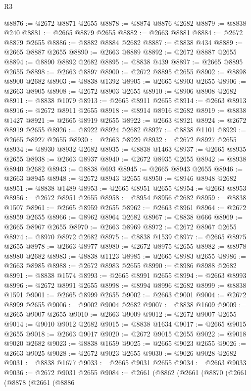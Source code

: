 \begin{lexlean}{R3}
\begin{coremodule}
@8876 := @2672 @8871 @2655
@8878 := @8874 @8876 @2682
@8879 := @8838 @240
@8881 := @2665 @8879 @2655
@8882 := @2663 @8881
@8884 := @2672 @8879 @2655
@8886 := @8882 @8884 @2682
@8887 := @8838 @434
@8889 := @2665 @8887 @2655
@8890 := @2663 @8889
@8892 := @2672 @8887 @2655
@8894 := @8890 @8892 @2682
@8895 := @8838 @439
@8897 := @2665 @8895 @2655
@8898 := @2663 @8897
@8900 := @2672 @8895 @2655
@8902 := @8898 @8900 @2682
@8903 := @8838 @1392
@8905 := @2665 @8903 @2655
@8906 := @2663 @8905
@8908 := @2672 @8903 @2655
@8910 := @8906 @8908 @2682
@8911 := @8838 @1079
@8913 := @2665 @8911 @2655
@8914 := @2663 @8913
@8916 := @2672 @8911 @2655
@8918 := @8914 @8916 @2682
@8919 := @8838 @1427
@8921 := @2665 @8919 @2655
@8922 := @2663 @8921
@8924 := @2672 @8919 @2655
@8926 := @8922 @8924 @2682
@8927 := @8838 @1101
@8929 := @2665 @8927 @2655
@8930 := @2663 @8929
@8932 := @2672 @8927 @2655
@8934 := @8930 @8932 @2682
@8935 := @8838 @1463
@8937 := @2665 @8935 @2655
@8938 := @2663 @8937
@8940 := @2672 @8935 @2655
@8942 := @8938 @8940 @2682
@8943 := @8838 @693
@8945 := @2665 @8943 @2655
@8946 := @2663 @8945
@8948 := @2672 @8943 @2655
@8950 := @8946 @8948 @2682
@8951 := @8838 @1489
@8953 := @2665 @8951 @2655
@8954 := @2663 @8953
@8956 := @2672 @8951 @2655
@8958 := @8954 @8956 @2682
@8959 := @8838 @1507
@8961 := @2665 @8959 @2655
@8962 := @2663 @8961
@8964 := @2672 @8959 @2655
@8966 := @8962 @8964 @2682
@8967 := @8838 @666
@8969 := @2665 @8967 @2655
@8970 := @2663 @8969
@8972 := @2672 @8967 @2655
@8974 := @8970 @8972 @2682
@8975 := @8838 @1539
@8977 := @2665 @8975 @2655
@8978 := @2663 @8977
@8980 := @2672 @8975 @2655
@8982 := @8978 @8980 @2682
@8983 := @8838 @1123
@8985 := @2665 @8983 @2655
@8986 := @2663 @8985
@8988 := @2672 @8983 @2655
@8990 := @8986 @8988 @2682
@8991 := @8838 @1574
@8993 := @2665 @8991 @2655
@8994 := @2663 @8993
@8996 := @2672 @8991 @2655
@8998 := @8994 @8996 @2682
@8999 := @8838 @1591
@9001 := @2665 @8999 @2655
@9002 := @2663 @9001
@9004 := @2672 @8999 @2655
@9006 := @9002 @9004 @2682
@9007 := @8838 @1609
@9009 := @2665 @9007 @2655
@9010 := @2663 @9009
@9012 := @2672 @9007 @2655
@9014 := @9010 @9012 @2682
@9015 := @8838 @1634
@9017 := @2665 @9015 @2655
@9018 := @2663 @9017
@9020 := @2672 @9015 @2655
@9022 := @9018 @9020 @2682
@9023 := @8838 @1659
@9025 := @2665 @9023 @2655
@9026 := @2663 @9025
@9028 := @2672 @9023 @2655
@9030 := @9026 @9028 @2682
@9031 := @8838 @1677
@9033 := @2665 @9031 @2655
@9034 := @2663 @9033
@9036 := @2672 @9031 @2655
@9084 := @2661
    (@8862
      (@2661
        (@8870
          (@2661
            (@8878
              (@2661
                (@8886

\end{coremodule}
\end{lexlean}
